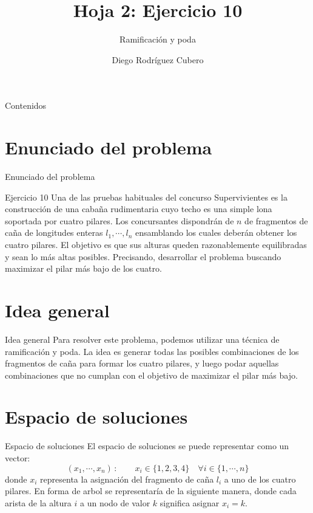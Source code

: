 \documentclass[aspectratio=169]{beamer}
\title{Hoja 2: Ejercicio 10}
\subtitle{Ramificación y poda}
\author{Diego Rodríguez Cubero}
\institute{UCM}
\begin{document}
\begin{frame}
    \titlepage
\end{frame}

\begin{frame}{Contenidos}
    \tableofcontents
\end{frame}

\section{Enunciado del problema}
\begin{frame}{Enunciado del problema}
    \begin{block}{Ejercicio 10}
        Una de las pruebas habituales del concurso Supervivientes es la construcción de una cabaña rudimentaria cuyo techo es una simple lona soportada por cuatro pilares. Los concursantes dispondrán de $n$ de fragmentos de caña de longitudes enteras $l_1,\cdots , l_n$ ensamblando los cuales deberán obtener los cuatro pilares. El objetivo es que sus alturas queden razonablemente equilibradas y sean lo más altas posibles. Precisando, desarrollar el problema buscando maximizar el pilar más bajo de los cuatro.

    \end{block}
\end{frame}

\section{Idea general}
\begin{frame}{Idea general}
    Para resolver este problema, podemos utilizar una técnica de ramificación y poda. La idea es generar todas las posibles combinaciones de los fragmentos de caña para formar los cuatro pilares, y luego podar aquellas combinaciones que no cumplan con el objetivo de maximizar el pilar más bajo.
\end{frame}

\section{Espacio de soluciones}
\begin{frame}{Espacio de soluciones}
    El espacio de soluciones se puede representar como un vector:
    \[ (x_1, \cdots , x_n) \, : \qquad x_i \in \{1,2,3,4\} \quad \forall i \in \{1,\cdots,n\} \]
    donde $x_i$ representa la asignación del fragmento de caña $l_i$ a uno de los cuatro pilares.
    En forma de arbol se representaría de la siguiente manera, donde cada arista de la altura $i$ a un nodo de valor $k$ significa asignar $x_i=k$.
\end{frame}
\end{document}

